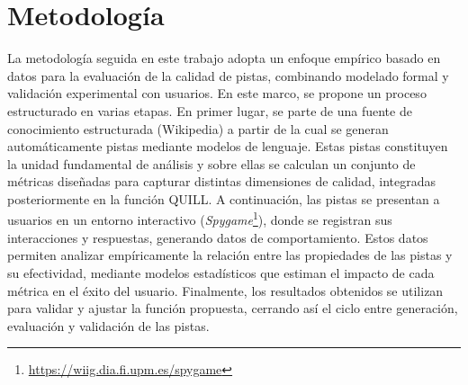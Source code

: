 \documentclass[../main.tex]{subfiles}
\begin{document}
\section{Metodología}

La metodología seguida en este trabajo adopta un enfoque empírico basado en datos para la evaluación de la calidad de pistas, combinando modelado formal y validación experimental con usuarios. En este marco, se propone un proceso estructurado en varias etapas. En primer lugar, se parte de una fuente de conocimiento estructurada (Wikipedia) a partir de la cual se generan automáticamente pistas mediante modelos de lenguaje. Estas pistas constituyen la unidad fundamental de análisis y sobre ellas se calculan un conjunto de métricas diseñadas para capturar distintas dimensiones de calidad, integradas posteriormente en la función QUILL. A continuación, las pistas se presentan a usuarios en un entorno interactivo (\textit{Spygame}\footnote{\url{https://wiig.dia.fi.upm.es/spygame}}), donde se registran sus interacciones y respuestas, generando datos de comportamiento. Estos datos permiten analizar empíricamente la relación entre las propiedades de las pistas y su efectividad, mediante modelos estadísticos que estiman el impacto de cada métrica en el éxito del usuario. Finalmente, los resultados obtenidos se utilizan para validar y ajustar la función propuesta, cerrando así el ciclo entre generación, evaluación y validación de las pistas.
\end{document}
